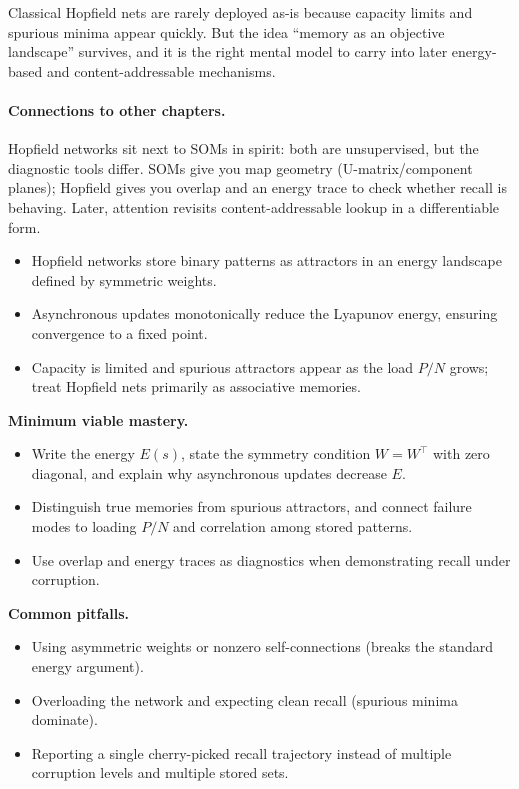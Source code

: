 Classical Hopfield nets are rarely deployed as-is because capacity limits and spurious minima appear quickly. But the idea ``memory as an objective landscape'' survives, and it is the right mental model to carry into later energy-based and content-addressable mechanisms.

\paragraph{Connections to other chapters.} Hopfield networks sit next to SOMs in spirit: both are unsupervised, but the diagnostic tools differ. SOMs give you map geometry (U-matrix/component planes); Hopfield gives you overlap and an energy trace to check whether recall is behaving. Later, attention revisits content-addressable lookup in a differentiable form.

\begin{tcolorbox}[summarybox, title={Key takeaways}]
\begin{itemize}
    \item Hopfield networks store binary patterns as attractors in an energy landscape defined by symmetric weights.
    \item Asynchronous updates monotonically reduce the Lyapunov energy, ensuring convergence to a fixed point.
    \item Capacity is limited and spurious attractors appear as the load \(P/N\) grows; treat Hopfield nets primarily as associative memories.
\end{itemize}

\medskip
\noindent\textbf{Minimum viable mastery.}
\begin{itemize}
    \item Write the energy \(E(s)\), state the symmetry condition \(W=W^\top\) with zero diagonal, and explain why asynchronous updates decrease \(E\).
    \item Distinguish true memories from spurious attractors, and connect failure modes to loading \(P/N\) and correlation among stored patterns.
    \item Use overlap and energy traces as diagnostics when demonstrating recall under corruption.
\end{itemize}

\noindent\textbf{Common pitfalls.}
\begin{itemize}
    \item Using asymmetric weights or nonzero self-connections (breaks the standard energy argument).
    \item Overloading the network and expecting clean recall (spurious minima dominate).
    \item Reporting a single cherry-picked recall trajectory instead of multiple corruption levels and multiple stored sets.
\end{itemize}
\end{tcolorbox}

